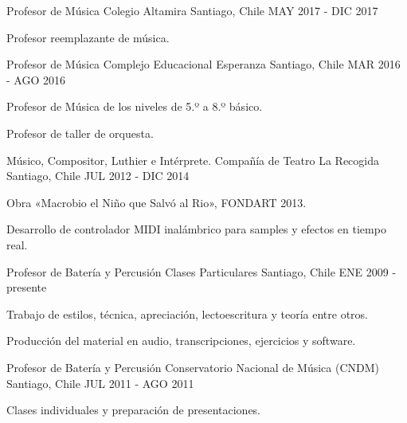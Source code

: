 \begin{cventries}
  \cventry
    {Profesor de Música}
    {Colegio Altamira}
    {Santiago, Chile}
    {MAY 2017 - DIC 2017}
    {
      \begin{cvitems} %
        \item {Profesor reemplazante de música.}
      \end{cvitems}
    }

  \cventry
    {Profesor de Música}
    {Complejo Educacional Esperanza}
    {Santiago, Chile}
    {MAR 2016 - AGO 2016}
    {
      \begin{cvitems} %
        \item {Profesor de Música de los niveles de 5.º a 8.º básico.}
        \item {Profesor de taller de orquesta.}
      \end{cvitems}
    }

  \cventry
    {Músico, Compositor, Luthier e Intérprete.}
    {Compañía de Teatro La Recogida}
    {Santiago, Chile}
    {JUL 2012 - DIC 2014}
    {
      \begin{cvitems} %
        \item {Obra «Macrobio el Niño que Salvó al Rio», FONDART 2013.}
        \item {Desarrollo de controlador MIDI inalámbrico para samples y efectos en tiempo real.}
      \end{cvitems}
    }   

  \cventry
    {Profesor de Batería y Percusión}
    {Clases Particulares}
    {Santiago, Chile}
    {ENE 2009 - presente}
    {
      \begin{cvitems} %
        \item {Trabajo de estilos, técnica, apreciación, lectoescritura y teoría entre otros.}
        \item {Producción del material en audio, transcripciones, ejercicios y software.}
      \end{cvitems}
    }

  \cventry
    {Profesor de Batería y Percusión}
    {Conservatorio Nacional de Música (CNDM)}
    {Santiago, Chile}
    {JUL 2011 - AGO 2011}
    {
      \begin{cvitems} %
        \item {Clases individuales y preparación de presentaciones.}
      \end{cvitems}
    }


\end{cventries}
